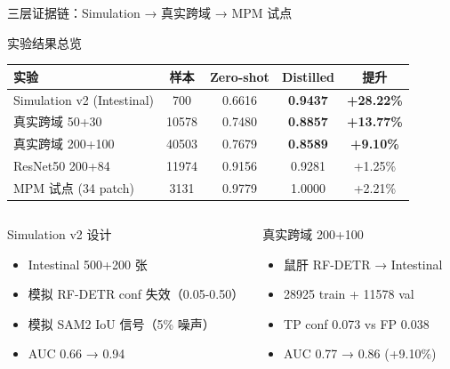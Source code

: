 \documentclass[aspectratio=169, 10pt]{beamer}
\begin{document}
\begin{frame}{三层证据链：Simulation → 真实跨域 → MPM 试点}
  \begin{block}{实验结果总览}
    \centering
    \small
    \begin{tabular}{lcccc}
      \toprule
      \textbf{实验} & \textbf{样本} & \textbf{Zero-shot} & \textbf{Distilled} & \textbf{提升} \\
      \midrule
      Simulation v2 (Intestinal) & 700 & 0.6616 & \textbf{0.9437} & \textcolor{mygreen}{\textbf{+28.22\%}} \\
      真实跨域 50+30 & 10578 & 0.7480 & \textbf{0.8857} & \textcolor{mygreen}{\textbf{+13.77\%}} \\
      真实跨域 200+100 & 40503 & 0.7679 & \textbf{0.8589} & \textcolor{mygreen}{\textbf{+9.10\%}} \\
      ResNet50 200+84 & 11974 & 0.9156 & 0.9281 & +1.25\% \\
      MPM 试点 (34 patch) & 3131 & 0.9779 & 1.0000 & +2.21\% \\
      \bottomrule
    \end{tabular}
  \end{block}
  \vspace{-0.3em}
  \begin{columns}[T]
    \begin{block}{Simulation v2 设计}
      \begin{itemize}
        \item Intestinal 500+200 张
        \item 模拟 RF-DETR conf 失效（0.05-0.50）
        \item 模拟 SAM2 IoU 信号（5\% 噪声）
        \item AUC 0.66 → 0.94
      \end{itemize}
    \end{block}
    \begin{block}{真实跨域 200+100}
      \begin{itemize}
        \item 鼠肝 RF-DETR → Intestinal
        \item 28925 train + 11578 val
        \item TP conf 0.073 vs FP 0.038
        \item AUC 0.77 → 0.86 (+9.10\%)
      \end{itemize}
    \end{block}
  \end{columns}
\end{frame}
\end{document}
